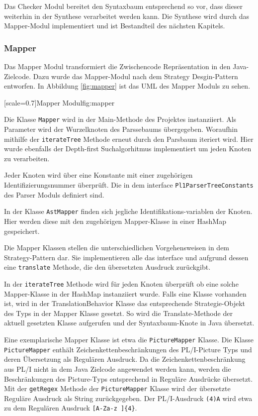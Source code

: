 Das Checker Modul bereitet den Syntaxbaum entsprechend so vor, dass dieser weiterhin in der Synthese verarbeitet werden kann.
Die Synthese wird durch das Mapper-Modul implementiert und ist Bestandteil des nächsten Kapitels.
 
 \pagebreak
\subsubsection{Mapper}
Das Mapper Modul transformiert die Zwischencode Repräsentation in den Java-Zielcode. Dazu wurde das Mapper-Modul nach dem Strategy Desgin-Pattern entworfen.
In Abbildung \ref{fig:mapper} ist das UML des Mapper Moduls zu sehen. 


[scale=0.7]{Mapper Modul}{fig:mapper}
\pagebreak

Die Klasse \verb+Mapper+ wird in der Main-Methode des Projektes instanziiert. Als Parameter wird der Wurzelknoten des Parssebaums übergegeben.
Woraufhin mithilfe der \verb+iterateTree+ Methode erneut durch den Parsbaum iteriert wird. Hier wurde ebenfalls der Depth-first Suchalgorhitmus implementiert um jeden Knoten zu verarbeiten. 

Jeder Knoten wird über eine Konstante mit einer zugehörigen Identifizierungsnummer überprüft. Die in dem interface \verb+Pl1ParserTreeConstants+ des Parser Moduls definiert sind. 

In der Klasse \verb+AstMapper+ finden sich jegliche Identifikations-variablen der Knoten. Hier werden diese mit den zugehörigen Mapper-Klasse in einer HashMap gespeichert.

Die Mapper Klassen stellen die unterschiedlichen Vorgehensweisen in dem Strategy-Pattern dar. Sie implementieren alle das  interface und aufgrund dessen eine \verb+translate+ Methode, die den übersetzten Ausdruck zurückgibt. 

In der \verb+iterateTree+ Methode wird für jeden Knoten überprüft ob eine solche Mapper-Klasse in der HashMap instanziiert wurde.
Falls eine Klasse vorhanden ist, wird in der TranslationBehavior Klasse das entsprechende Strategie-Objekt
des Typs  in der
Mapper Klasse gesetzt. So wird die Translate-Methode der aktuell gesetzten Klasse aufgerufen und der Syntaxbaum-Knote in Java übersetzt.

Eine exemplarische Mapper Klasse ist etwa die \verb+PictureMapper+ Klasse.
Die Klasse \verb+PictureMapper+ enthält Zeichenkettenbeschränkungen des PL/I-Picture Typs und deren Übersetzung als Regulären Ausdruck.
Da die Zeichenkettenbeschränkung aus PL/I nicht in dem Java Zielcode angewendet werden kann, werden die Beschränkungen des Picture-Typs entsprechend in Reguläre Ausdrücke übersetzt.
Mit der \verb+getRegex+ Methode der \verb+PictureMapper+ Klasse wird der übersetzte Reguläre Ausdruck als String zurückgegeben.
Der PL/I-Ausdruck \verb+(4)A+ wird etwa zu dem Regulären Ausdruck \verb+[A-Za-z ]{4}+.   


